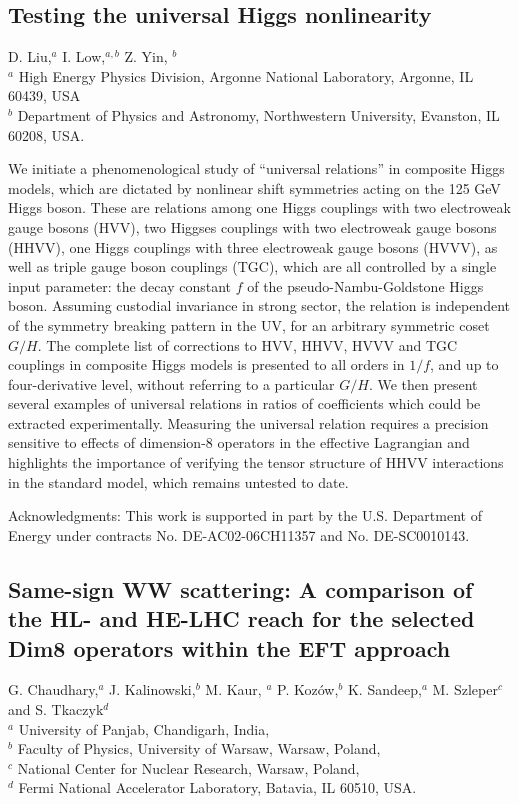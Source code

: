 \documentclass[../report.tex]{subfiles}
\begin{document}
\subsection{Testing the universal Higgs nonlinearity}
% 
\label{sect-illus}
\begin{center}
 {D. Liu,$^a$   I. Low,$^{a,b} $ Z. Yin, $^b$\\
}
 {\small $^a$ High Energy Physics Division, Argonne National Laboratory, Argonne, IL 60439, USA \\
$^b$ Department of Physics and Astronomy, Northwestern University, Evanston, IL 60208, USA.}
\end{center}
We initiate a phenomenological study of ``universal relations'' in composite Higgs models, which  are  dictated by nonlinear shift symmetries acting on the 125 GeV Higgs boson. These are relations among one Higgs couplings with two electroweak gauge bosons (HVV), two Higgses couplings with two electroweak gauge bosons (HHVV), one Higgs couplings with three electroweak gauge bosons (HVVV), as well as triple gauge boson couplings (TGC), which are all controlled by a single input parameter: the decay constant $f$ of the pseudo-Nambu-Goldstone Higgs boson.  Assuming custodial invariance in strong sector, the  relation is independent of the symmetry breaking pattern in the UV, for an arbitrary  symmetric coset $G/H$. The complete list of corrections to HVV, HHVV, HVVV and TGC couplings in composite Higgs models is presented to all orders in $1/f$, and up to four-derivative level,  without referring to a particular $G/H$. We then present several examples of  universal relations in ratios of coefficients which could be extracted experimentally. Measuring the universal relation requires a precision sensitive to effects of dimension-8 operators in the effective Lagrangian and highlights the importance of verifying the tensor structure of HHVV interactions in the standard model, which remains untested to date.


Acknowledgments: 
This work is supported in part by the U.S. Department of Energy under contracts No. DE-AC02-06CH11357 and No. DE-SC0010143.

\subsection{ Same-sign WW scattering: A comparison of the HL- and HE-LHC reach for the selected Dim8 operators within  the EFT approach}
% 
\label{sect-illus}
\begin{center}
 {G. Chaudhary,$^a$   J. Kalinowski,$^{b} $ M. Kaur, $^a$
P. Koz{\'o}w,$^b$ K. Sandeep,$^a$ M. Szleper$^c$ 
and
S. Tkaczyk$^d$\\
}
 {\small $^a$ University of Panjab, Chandigarh, India,\\
$^b$ Faculty of Physics, University of Warsaw, Warsaw,  Poland, \\
$^c$ National Center for Nuclear Research,  Warsaw, Poland, \\
$^d$  Fermi National Accelerator Laboratory, Batavia, IL 60510, USA.}
\end{center}
\end{document}
